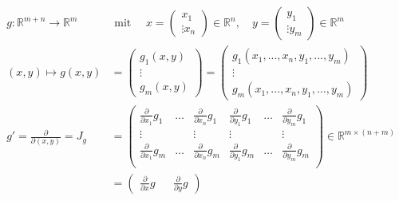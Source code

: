 \documentclass[11pt,a4paper]{book}
\newcommand {\R}	{\mathbb{R}}
\newcommand {\Rn}	{\mathbb{R}^n}
\newcommand {\Rm}	{\mathbb{R}^m}
\newcommand{\1}    	{\mathbbm{1}}
\newcommand{\mitt}	{\textrm{ mit }}
\begin{document}
\begin{align*}
	g: \R^{m+n} \rightarrow \Rm \quad&\mitt\quad
	x = \left( \begin{array}{c}
		x_1 \\ \vdots x_n
	\end{array} \right) \in \Rn, \quad
	y = \left( \begin{array}{c}
		y_1 \\ \vdots y_m
	\end{array} \right) \in \Rm \\
	(x,y) \mapsto g(x,y) &= 
	\left( \begin{array}{c}
		g_1(x,y) \\ \vdots \\ g_m(x,y)
	\end{array} \right) = 
	\left( \begin{array}{c}
		g_1(x_1, ..., x_n, y_1, ..., y_m) \\
		\vdots \\
		g_m(x_1, ..., x_n, y_1, ..., y_m)
	\end{array} \right) \\
	g' = \frac{\partial}{\partial(x,y)}= J_g &= \left( \begin{array}{cccccc}
		\frac{\partial}{\partial x_1} g_1 &
		\hdots &
		\frac{\partial}{\partial x_n} g_1 &
		\frac{\partial}{\partial y_1} g_1 &
		\hdots & 
		\frac{\partial}{\partial y_m} g_1 \\
		\vdots & & \vdots & \vdots & & \vdots \\
		\frac{\partial}{\partial x_1} g_m &
		\hdots &
		\frac{\partial}{\partial x_n} g_m &
		\frac{\partial}{\partial y_1} g_m &
		\hdots & 
		\frac{\partial}{\partial y_m} g_m \\
	\end{array} \right) \in \R^{m \times (n+m)} \\
	&= \left( \begin{array}{ccc}
		\frac{\partial}{\partial x} g &
		&
		\frac{\partial}{\partial y} g
	\end{array} \right)
\end{align*}
\end{document}
